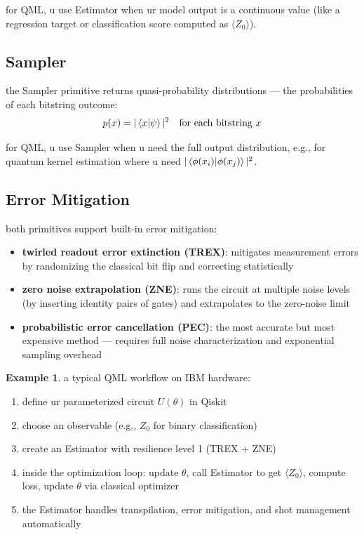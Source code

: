 \documentclass[11pt,a4paper]{article}
\theoremstyle{definition}
\newtheorem{example}{Example}[section]
\theoremstyle{remark}
\begin{document}
for QML, u use Estimator when ur model output is a continuous value (like a regression target or classification score computed as $\langle Z_0 \rangle$).

\subsection{Sampler}

the Sampler primitive returns quasi-probability distributions --- the probabilities of each bitstring outcome:
\[
p(x) = |\braket{x|\psi}|^2 \quad \text{for each bitstring } x
\]

for QML, u use Sampler when u need the full output distribution, e.g., for quantum kernel estimation where u need $|\braket{\phi(x_i)|\phi(x_j)}|^2$.

\subsection{Error Mitigation}

both primitives support built-in error mitigation:
\begin{itemize}[leftmargin=*]
    \item \textbf{twirled readout error extinction (TREX)}: mitigates measurement errors by randomizing the classical bit flip and correcting statistically
    \item \textbf{zero noise extrapolation (ZNE)}: runs the circuit at multiple noise levels (by inserting identity pairs of gates) and extrapolates to the zero-noise limit
    \item \textbf{probabilistic error cancellation (PEC)}: the most accurate but most expensive method --- requires full noise characterization and exponential sampling overhead
\end{itemize}

\begin{example}
a typical QML workflow on IBM hardware:
\begin{enumerate}[label=\arabic*.]
    \item define ur parameterized circuit $U(\theta)$ in Qiskit
    \item choose an observable (e.g., $Z_0$ for binary classification)
    \item create an Estimator with resilience level 1 (TREX + ZNE)
    \item inside the optimization loop: update $\theta$, call Estimator to get $\langle Z_0 \rangle$, compute loss, update $\theta$ via classical optimizer
    \item the Estimator handles transpilation, error mitigation, and shot management automatically
\end{enumerate}
\end{example}
\end{document}
